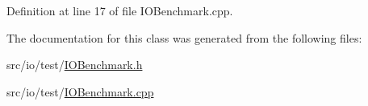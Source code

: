 Definition at line 17 of file I\-O\-Benchmark.\-cpp.



The documentation for this class was generated from the following files\-:\begin{DoxyCompactItemize}
\item 
src/io/test/\hyperlink{_i_o_benchmark_8h}{I\-O\-Benchmark.\-h}\item 
src/io/test/\hyperlink{_i_o_benchmark_8cpp}{I\-O\-Benchmark.\-cpp}\end{DoxyCompactItemize}
